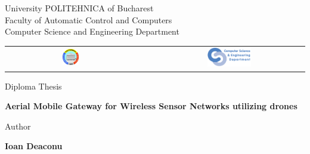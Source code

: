 


\pagestyle{empty}
\sffamily

\noindent
\begin{center}
	\Large
	University POLITEHNICA of Bucharest\\
	Faculty of Automatic Control and Computers \\
	Computer Science and Engineering Department \\
	\begin{table}[h]
		\begin{center}
			\begin{tabular}{cccc}
				\includegraphics[width=0.13\textwidth]
				{img/upb.png}
				& & &
				\includegraphics[width=0.30\textwidth]
				{img/cs.png}
			\end{tabular}
		\end{center}
	\end{table}
\end{center}

\vfill\vfill
\begin{center}
	\Large
	Diploma Thesis\\
\end{center}

\vfill
\begin{center}
	\HUGE\bfseries
	Aerial Mobile Gateway for Wireless Sensor Networks utilizing drones\\
	\vfill
	\large
\end{center}

\vfill
\begin{center}
	\Large
	Author
\end{center}

\begin{center}
	\huge\bfseries
	Ioan Deaconu
\end{center}

